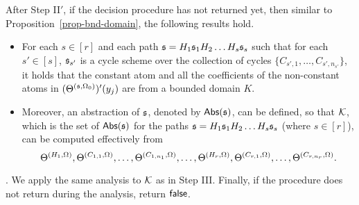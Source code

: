 After Step II$'$, if the decision procedure has not returned yet, then similar to Proposition~\ref{prop-bnd-domain}, the following results hold.
\begin{itemize}
\item For each $s \in [r]$ and each path ${\mathfrak{s} }=H_1 {\mathfrak{s} }_1 H_2 \dots H_s {\mathfrak{s} }_s$ such that for each $s'\in [s]$, ${\mathfrak{s} }_{s'}$ is a cycle scheme over the collection of cycles $\{C_{s',1},\dots,C_{s',n_{s'}}\}$, it holds that the constant atom and all the coefficients of the non-constant atoms in $(\Theta^{({\mathfrak{s} },\Omega_0)})'(y_j)$ are from a bounded domain $K$.
%
\item Moreover,  an abstraction of ${\mathfrak{s} }$, denoted by $\mathsf{Abs}({\mathfrak{s} })$, can be defined, so that ${\mathcal{K}}$, which is the set of $\mathsf{Abs}({\mathfrak{s} })$ for the paths ${\mathfrak{s} }=H_1 {\mathfrak{s} }_1 H_2 \dots H_s {\mathfrak{s} }_s$ (where $s \in [r]$), can be computed effectively from 
\[\Theta^{(H_1,\Omega)}, \Theta^{(C_{1,1},\Omega)}, \dots, \Theta^{(C_{1,n_1},\Omega)},\dots, \Theta^{(H_r,\Omega)}, \Theta^{(C_{r,1},\Omega)}, \dots, \Theta^{(C_{r,n_r},\Omega)}.\]
\end{itemize}


\smallskip 

. We apply the same analysis to ${\mathcal{K}}$ as in Step III. Finally, if the procedure does not return during the analysis, return $\mathsf{false}$.

